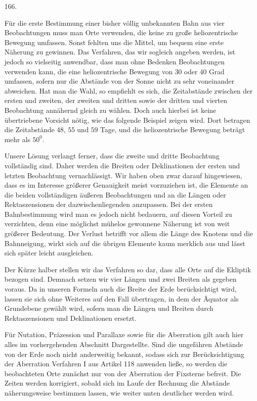 \begin{center}\hypertarget{native-229-article166}{}166.\end{center}
Für die erste Bestimmung einer bisher völlig unbekannten Bahn aus vier Beobachtungen muss man Orte verwenden, die keine zu große heliozentrische Bewegung umfassen. Sonst fehlten uns die Mittel, um bequem eine erste Näherung zu gewinnen. Das Verfahren, das wir sogleich angeben werden, ist jedoch so vielseitig anwendbar, dass man ohne Bedenken Beobachtungen verwenden kann, die eine heliozentrische Bewegung von $30$ oder $40$ Grad umfassen, sofern nur die Abstände von der Sonne nicht zu sehr voneinander abweichen. Hat man die Wahl, so empfiehlt es sich, die Zeitabstände zwischen der ersten und zweiten, der zweiten und dritten sowie der dritten und vierten Beobachtung annähernd gleich zu wählen. Doch auch hierbei ist keine übertriebene Vorsicht nötig, wie das folgende Beispiel zeigen wird. Dort betragen die Zeitabstände $48$, $55$ und $59$ Tage, und die heliozentrische Bewegung beträgt mehr als $50^0$.

Unsere Lösung verlangt ferner, dass die zweite und dritte Beobachtung vollständig sind. Daher werden die Breiten oder Deklinationen der ersten und letzten Beobachtung vernachlässigt. Wir haben oben zwar darauf hingewiesen, dass es im Interesse größerer Genauigkeit meist vorzuziehen ist, die Elemente an die beiden vollständigen äußeren Beobachtungen und an die Längen oder Rektaszensionen der dazwischenliegenden anzupassen. Bei der ersten Bahnbestimmung wird man es jedoch nicht bedauern, auf diesen Vorteil zu verzichten, denn eine möglichst mühelos gewonnene Näherung ist von weit größerer Bedeutung. Der Verlust betrifft vor allem die Länge des Knotens und die Bahnneigung, wirkt sich auf die übrigen Elemente kaum merklich aus und lässt sich später leicht ausgleichen.

Der Kürze halber stellen wir das Verfahren so dar, dass alle Orte auf die Ekliptik bezogen sind. Demnach setzen wir vier Längen und zwei Breiten als gegeben voraus. Da in unseren Formeln auch die Breite der Erde berücksichtigt wird, lassen sie sich ohne Weiteres auf den Fall übertragen, in dem der Äquator als Grundebene gewählt wird, sofern man die Längen und Breiten durch Rektaszensionen und Deklinationen ersetzt.

Für Nutation, Präzession und Parallaxe sowie für die Aberration gilt auch hier alles im vorhergehenden Abschnitt Dargestellte. Sind die ungefähren Abstände von der Erde noch nicht anderweitig bekannt, sodass sich zur Berücksichtigung der Aberration Verfahren I aus Artikel 118 anwenden ließe, so werden die beobachteten Orte zunächst nur von der Aberration der Fixsterne befreit. Die Zeiten werden korrigiert, sobald sich im Laufe der Rechnung die Abstände näherungsweise bestimmen lassen, wie weiter unten deutlicher werden wird.
